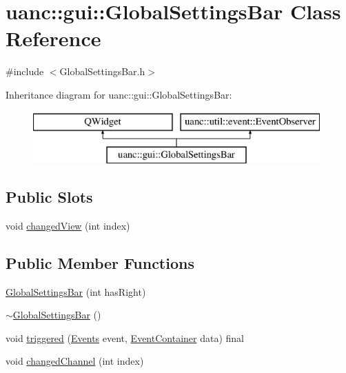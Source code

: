 \hypertarget{classuanc_1_1gui_1_1_global_settings_bar}{}\section{uanc\+:\+:gui\+:\+:Global\+Settings\+Bar Class Reference}
\label{classuanc_1_1gui_1_1_global_settings_bar}


{\ttfamily \#include $<$Global\+Settings\+Bar.\+h$>$}

Inheritance diagram for uanc\+:\+:gui\+:\+:Global\+Settings\+Bar\+:\begin{figure}[H]
\begin{center}
\leavevmode
\includegraphics[height=2.000000cm]{classuanc_1_1gui_1_1_global_settings_bar}
\end{center}
\end{figure}
\subsection*{Public Slots}
\begin{DoxyCompactItemize}
\item 
void \hyperlink{classuanc_1_1gui_1_1_global_settings_bar_a76c5c5bac6194b489297d75544df830b}{changed\+View} (int index)
\end{DoxyCompactItemize}
\subsection*{Public Member Functions}
\begin{DoxyCompactItemize}
\item 
\hyperlink{classuanc_1_1gui_1_1_global_settings_bar_a7b4d8ddaae819768287db58572982718}{Global\+Settings\+Bar} (int has\+Right)
\item 
\hyperlink{classuanc_1_1gui_1_1_global_settings_bar_a26cb9645d1f50fc7f3be71f15720e43e}{$\sim$\+Global\+Settings\+Bar} ()
\item 
void \hyperlink{classuanc_1_1gui_1_1_global_settings_bar_a780fabb890235753ff90c1403638c47d}{triggered} (\hyperlink{namespaceuanc_1_1util_1_1event_a63f690675589114db9c6bcbe6f1088a4}{Events} event, \hyperlink{classuanc_1_1util_1_1event_1_1_event_container}{Event\+Container} data) final
\item 
void \hyperlink{classuanc_1_1gui_1_1_global_settings_bar_a3466ddea370d0c7e4c1ae7062092bc5a}{changed\+Channel} (int index)
\end{DoxyCompactItemize}
